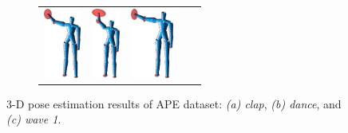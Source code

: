 \begin{figure}
\begin{subfigure}[b]{1\linewidth}
\begin{tabular}{ccccc}
			\includegraphics[height=2.3cm]{fig/body/APE/wave12.png} &
			\includegraphics[height=2.3cm]{fig/body/APE/wave13.png} & 
			\includegraphics[height=2.3cm]{fig/body/APE/wave14.png} 
		\end{tabular}
		\label{fig/body/APE/wave1} 
	\end{subfigure}
	\caption{3-D pose estimation results of APE dataset: \emph{(a) clap}, \emph{(b) dance}, and \emph{(c) wave 1}.}
	\label{fig/body/APE2}
\end{figure}

